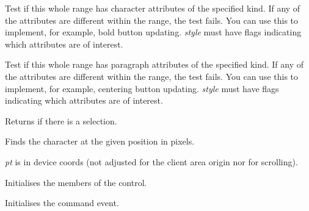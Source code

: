 
Test if this whole range has character attributes of the specified kind. If any
of the attributes are different within the range, the test fails. You
can use this to implement, for example, bold button updating. {\it style} must have
flags indicating which attributes are of interest.

\label{wxrichtextctrlhasparagraphattributes}


Test if this whole range has paragraph attributes of the specified kind. If any
of the attributes are different within the range, the test fails. You
can use this to implement, for example, centering button updating. {\it style} must have
flags indicating which attributes are of interest.

\label{wxrichtextctrlhasselection}


Returns \true if there is a selection.

\label{wxrichtextctrlhittest}



Finds the character at the given position in pixels.

{\it pt} is in device coords (not adjusted for the client area origin nor for scrolling).

\label{wxrichtextctrlinit}


Initialises the members of the control.

\label{wxrichtextctrlinitcommandevent}


Initialises the command event.

\label{wxrichtextctrlisdefaultstyleshowing}

